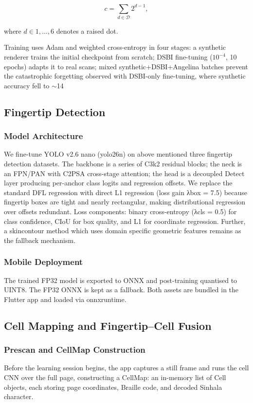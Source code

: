\documentclass{article}
\begin{document}
$$
c=\sum_{d\in\mathcal{D}}2^{d-1},
$$

where $d\in{1,\ldots,6}$ denotes a raised dot.

Training uses Adam and weighted cross-entropy in four stages: a synthetic renderer trains the initial checkpoint from scratch; DSBI fine-tuning ($10^{-4}$, 10 epochs) adapts it to real scans; mixed synthetic+DSBI+Angelina batches prevent the catastrophic forgetting observed with DSBI-only fine-tuning, where synthetic accuracy fell to $\sim$14%


\subsection{Fingertip Detection}

\subsubsection{Model Architecture}
We fine-tune YOLO v2.6 nano (yolo26n) on above mentioned three fingertip detection datasets.
The backbone is a series of C3k2 residual blocks; the neck is an FPN/PAN with C2PSA cross-stage
attention; the head is a decoupled Detect layer producing per-anchor class logits and regression
offsets. We replace the standard DFL regression with direct L1 regression (loss gain λbox = 7.5)
because fingertip boxes are tight and nearly rectangular, making distributional regression over offsets
redundant. Loss components: binary cross-entropy (λcls = 0.5) for class confidence, CIoU for box
quality, and L1 for coordinate regression. Further, a skincontour method which uses domain specific geometric features remains as the fallback mechanism.

\subsubsection{Mobile Deployment}
The trained FP32 model is exported to ONNX and post-training quantised to
 UINT8. The FP32 ONNX is kept as a fallback.
 Both assets are bundled in the Flutter app and loaded via onnxruntime.

\subsection{Cell Mapping and Fingertip--Cell Fusion}

\subsubsection{Prescan and CellMap Construction}
Before the learning session begins, the app captures a still frame and runs the cell CNN over the full page, constructing a CellMap: an in-memory list of Cell objects, each storing page coordinates, Braille code, and decoded Sinhala character.
\end{document}
